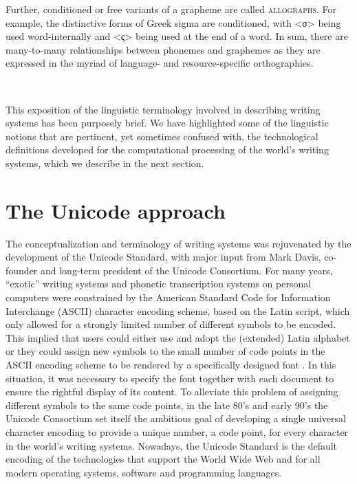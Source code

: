 Further, conditioned or free variants of a grapheme are called
\textsc{allographs}. For example, the distinctive forms of Greek sigma are
conditioned, with <σ> being used word-internally and <ς> being used at the end
of a word. In sum, there are many-to-many relationships between phonemes and
graphemes as they are expressed in the myriad of language- and resource-specific
orthographies.

\ 

\noindent This exposition of the linguistic terminology involved in describing writing
systems has been purposely brief. We have highlighted some of the linguistic
notions that are pertinent, yet sometimes confused with, the technological
definitions developed for the computational processing of the world's writing
systems, which we describe in the next section.

\section{The Unicode approach}
\label{the-unicode-approach}

The conceptualization and terminology of writing systems was rejuvenated by
the development of the Unicode Standard, with major input from Mark Davis,
co-founder and long-term president of the Unicode Consortium. For many years,
``exotic'' writing systems and phonetic transcription systems on personal
computers were constrained by the American Standard Code for Information
Interchange (ASCII) character encoding scheme, based on the Latin script, which
only allowed for a strongly limited number of different symbols to be encoded.
This implied that users could either use and adopt the (extended) Latin alphabet
or they could assign new symbols to the small number of code points in the ASCII
encoding scheme to be rendered by a specifically designed font
\citep{BirdSimons2003}. In this situation, it was necessary to specify the font
together with each document to ensure the rightful display of its content. To
alleviate this problem of assigning different symbols to the same code points,
in the late 80's and early 90's the Unicode Consortium set itself the ambitious
goal of developing a single universal character encoding to provide a unique
number, a code point, for every character in the world's writing systems.
Nowadays, the Unicode Standard is the default encoding of the technologies that
support the World Wide Web and for all modern operating systems, software and
programming languages.

